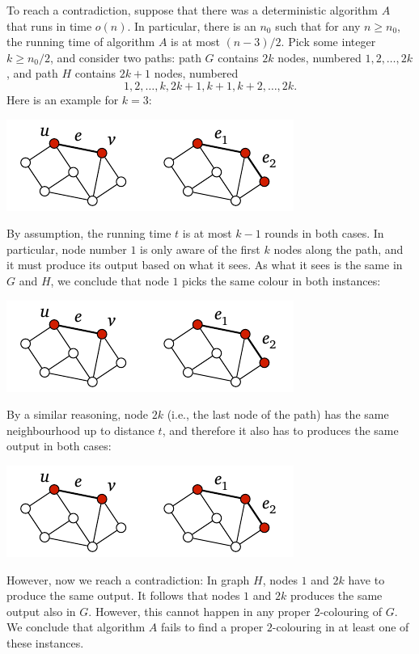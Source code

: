 To reach a contradiction, suppose that there was a deterministic algorithm $A$ that runs in time $o(n)$. In particular, there is an $n_0$ such that for any $n \ge n_0$, the running time of algorithm $A$ is at most $(n-3)/2$. Pick some integer $k \ge n_0/2$, and consider two paths: path $G$ contains $2k$ nodes, numbered $1,2,\dotsc,2k$, and path $H$ contains $2k+1$ nodes, numbered \[1,2,\dotsc,k,2k+1,k+1,k+2,\dotsc,2k.\] Here is an example for $k = 3$:
\begin{center}
    \includegraphics[page=\PIntroLbTwoA]{figs.pdf}
\end{center}
By assumption, the running time $t$ is at most $k-1$ rounds in both cases. In particular, node number $1$ is only aware of the first $k$ nodes along the path, and it must produce its output based on what it sees. As what it sees is the same in $G$ and $H$, we conclude that node $1$ picks the same colour in both instances:
\begin{center}
    \includegraphics[page=\PIntroLbTwoB]{figs.pdf}
\end{center}
By a similar reasoning, node $2k$ (i.e., the last node of the path) has the same neighbourhood up to distance $t$, and therefore it also has to produces the same output in both cases:
\begin{center}
    \includegraphics[page=\PIntroLbTwoC]{figs.pdf}
\end{center}
However, now we reach a contradiction: In graph $H$, nodes $1$ and $2k$ have to produce the same output. It follows that nodes $1$ and $2k$ produces the same output also in $G$. However, this cannot happen in any proper $2$-colouring of $G$. We conclude that algorithm $A$ fails to find a proper $2$-colouring in at least one of these instances.

